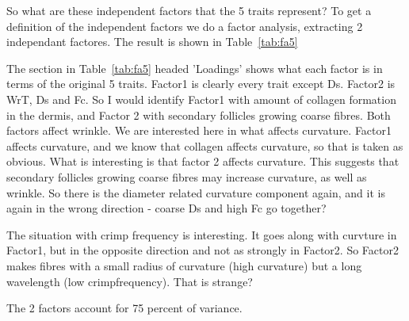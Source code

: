 \documentclass{article}
\begin{document}
% 

So what are these independent factors that the 5 traits represent? To get a definition of the independent factors we do a factor analysis, extracting 2 independant factores. The result is shown in Table~\ref{tab:fa5}

The section in Table~\ref{tab:fa5} headed 'Loadings' shows what each factor is in terms of the original 5 traits. Factor1 is clearly every trait except Ds. Factor2 is WrT, Ds and Fc. So I would identify Factor1 with amount of collagen formation in the dermis, and Factor 2 with secondary follicles growing coarse fibres. Both factors affect wrinkle. We are interested here in what affects curvature. Factor1 affects curvature, and we know that collagen affects curvature, so that is taken as obvious. What is interesting is that factor 2 affects curvature. This suggests that secondary follicles growing coarse fibres may increase curvature, as well as wrinkle. So there is the diameter related curvature component again, and it is again in the wrong direction - coarse Ds and high Fc go together?

The situation with crimp frequency is interesting. It goes along with curvture in Factor1, but in the opposite direction and not as strongly in Factor2. So Factor2 makes fibres with a small radius of curvature (high curvature) but a long wavelength (low crimpfrequency). That is strange?

The 2 factors account for 75 percent of variance. 


\end{document}
